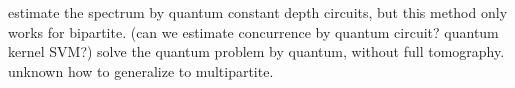 \documentclass[
reprint,
aps,
pra,
]{revtex4-2}
\theoremstyle{plain}
\newtheorem{theorem}{Theorem}
\theoremstyle{definition}
\newcommand{\dm}{\rho}
\begin{document}
estimate the spectrum by quantum constant depth circuits, but this method only works for bipartite.
(can we estimate concurrence by quantum circuit? quantum kernel SVM?)
solve the quantum problem by quantum, without full tomography.
unknown how to generalize to multipartite.

\end{document}
